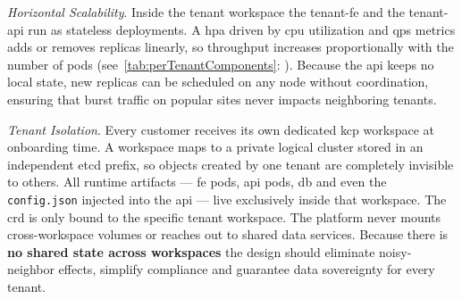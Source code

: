 \documentclass[11pt, a4paper, oneside, listof=totoc]{scrartcl}
\newcommand{\see}[1]{(see~\autoref{#1}: \textit{\nameref{#1}})}
\begin{document}
                \begin{enumerate}[label={[\arabic*]:},
                    ref=Challenge~\arabic*,
                    leftmargin=*,
                    itemsep=0.6\baselineskip]

                    \item\label{chal:architectureScalability}
                        \textit{Horizontal Scalability}.
                        Inside the tenant workspace the tenant-\gls{fe} and the tenant-\gls{api} run
                        as stateless deployments.
                        A \gls{hpa} driven by \gls{cpu} utilization and \gls{qps} metrics adds or
                        removes replicas linearly, so throughput increases proportionally with the
                        number of pods \see{tab:perTenantComponents}.
                        Because the \gls{api} keeps no local state, new replicas can be scheduled on
                        any node without coordination, ensuring that burst traffic on popular sites
                        never impacts neighboring tenants.

                    \item\label{chal:architectureIsolation}
                        \textit{Tenant Isolation}.
                        Every customer receives its own dedicated \gls{kcp} workspace at onboarding
                        time.
                        A workspace maps to a private logical cluster stored in an independent
                        \gls{etcd} prefix, so objects created by one tenant are completely invisible
                        to others.
                        All runtime artifacts --- \gls{fe} pods, \gls{api} pods, \gls{db} and even
                        the \texttt{config.json} injected into the \gls{api} --- live exclusively
                        inside that workspace.
                        The \gls{crd} is only bound to the specific tenant workspace.
                        The platform never mounts cross-workspace volumes or reaches out to shared
                        data services.
                        Because there is \textbf{no shared state across workspaces} the design
                        should eliminate noisy-neighbor effects, simplify compliance and guarantee
                        data sovereignty for every tenant.


\end{enumerate}
\end{document}
